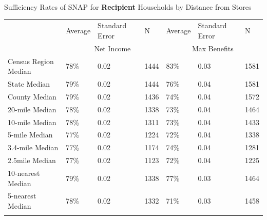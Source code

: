 \documentclass{beamer}
\begin{document}
\begin{frame}

\begin{table}[htbp]{Sufficiency Rates of SNAP for \textbf{Recipient} Households by Distance from Stores}

\begin{adjustbox}{height=1.5in}
  \centering
    \begin{tabular}{lllllll}
    \toprule
          & Average & Standard Error & N     & Average & Standard Error & N \\

     & \multicolumn{3}{c}{Net Income} & \multicolumn{3}{c}{Max Benefits} \\

    \midrule
    Census Region Median & 78\%  & 0.02  & 1444  & 83\%  & 0.03  & 1581 \\
    State Median & 79\%  & 0.02  & 1444  & 76\%  & 0.04  & 1581 \\
    County Median & 79\%  & 0.02  & 1436  & 74\%  & 0.04  & 1572 \\
    20-mile Median & 78\%  & 0.02  & 1338  & 73\%  & 0.04  & 1464 \\
    10-mile Median & 78\%  & 0.02  & 1311  & 73\%  & 0.04  & 1433 \\
    5-mile Median & 77\%  & 0.02  & 1224  & 72\%  & 0.04  & 1338 \\
    3.4-mile Median & 77\%  & 0.02  & 1174  & 74\%  & 0.04  & 1281 \\
    2.5mile Median & 77\%  & 0.02  & 1123  & 72\%  & 0.04  & 1225 \\
    10-nearest Median & 79\%  & 0.02  & 1338  & 77\%  & 0.03  & 1464 \\
    5-nearest Median & 78\%  & 0.02  & 1332  & 71\%  & 0.03  & 1458 \\
          &       &       &       &       &       &  \\


\end{tabular}
\end{adjustbox}
\end{table}
\end{frame}
\end{document}
